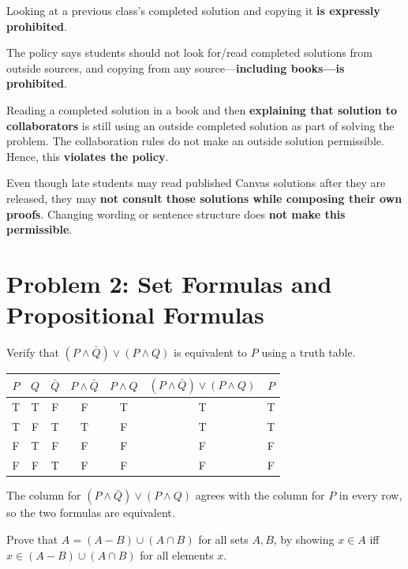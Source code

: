 \documentclass[11pt]{article}
\newcommand{\partlabel}[1]{%
    \noindent\makebox[2em][l]{\textbf{(#1)}}%
}
\begin{document}
\medskip

\partlabel{g}
Looking at a previous class's completed solution and copying it \textbf{is expressly prohibited}.

\medskip

\partlabel{h}
The policy says students should not look for/read completed solutions from outside sources, and copying from any source—\textbf{including books—is prohibited}.

\medskip

\partlabel{i}
Reading a completed solution in a book and then \textbf{explaining that solution to collaborators} is still using an outside completed solution as part of solving the problem. The collaboration rules do not make an outside solution permissible. Hence, this \textbf{violates the policy}.

\medskip

\partlabel{j}
Even though late students may read published Canvas solutions after they are released, they may \textbf{not consult those solutions while composing their own proofs}. Changing wording or sentence structure does \textbf{not make this permissible}.

\newpage
\section*{Problem 2: Set Formulas and Propositional Formulas}

\partlabel{a}
Verify that $(P \wedge \bar Q) \vee (P \wedge Q)$ is equivalent to $P$ using a truth table.

\begin{center}
\begin{tabular}{cc|c|c|c|c|c}
$P$ & $Q$ & $\bar Q$ & $P \wedge \bar Q$ & $P \wedge Q$ & $(P\wedge\bar Q)\vee(P\wedge Q)$ & $P$ \\
\hline
T & T & F & F & T & T & T \\
T & F & T & T & F & T & T \\
F & T & F & F & F & F & F \\
F & F & T & F & F & F & F \\
\end{tabular}
\end{center}

The column for $(P\wedge \bar Q)\vee(P\wedge Q)$ agrees with the column for $P$ in every row, so the two formulas are equivalent.

\bigskip

\partlabel{b}
Prove that $A = (A - B) \cup (A \cap B)$ for all sets $A, B$, by showing $x \in A$ iff $x \in (A-B)\cup(A\cap B)$ for all elements $x$.
\end{document}
